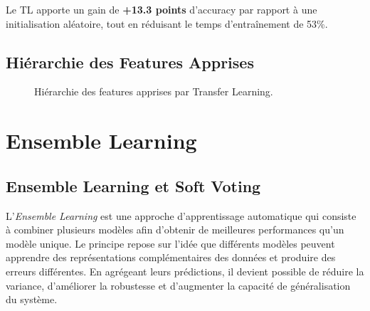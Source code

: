 \documentclass[12pt,a4paper,oneside]{report}
\begin{document}
Le TL apporte un gain de \textbf{+13.3 points} d'accuracy par rapport
à une initialisation aléatoire, tout en réduisant le temps d'entraînement
de 53\%.

\subsection{Hiérarchie des Features Apprises}

\begin{figure}[H]
\centering
{}
\caption{Hiérarchie des features apprises par Transfer Learning.}
\label{fig:feature_hierarchy}
\end{figure}

\section{Ensemble Learning}

\subsection{Ensemble Learning et Soft Voting}

L'\textit{Ensemble Learning} est une approche d'apprentissage automatique qui consiste à combiner plusieurs modèles afin d'obtenir de meilleures performances qu'un modèle unique. Le principe repose sur l'idée que différents modèles peuvent apprendre des représentations complémentaires des données et produire des erreurs différentes. En agrégeant leurs prédictions, il devient possible de réduire la variance, d'améliorer la robustesse et d'augmenter la capacité de généralisation du système.
\end{document}
